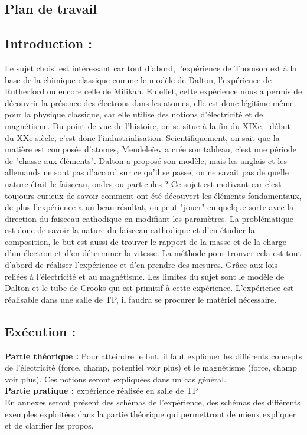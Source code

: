 \documentclass[../main.tex]{subfiles}
\begin{document}
\subsection{Plan de travail}


\subsection{Introduction :}
Le sujet choisi est intéressant car tout d'abord, l'expérience de Thomson est à la base de la chimique classique comme le modèle de Dalton, l'expérience de Rutherford ou encore celle de Milikan. En effet, cette expérience nous a permis de découvrir la présence des électrons dans les atomes, elle est donc légitime même pour la physique classique, car elle utilise des notions d'électricité et de magnétisme. Du point de vue de l'histoire, on se situe à la fin du XIXe - début du XXe siècle, c'est donc l'industrialisation. Scientifiquement, on sait que la matière est composée d'atomes, Mendeleïev a crée son tableau, c'est une période de "chasse aux éléments". Dalton a proposé son modèle, mais les anglais et les allemands ne sont pas d'accord sur ce qu'il se passe, on ne savait pas de quelle nature était le faisceau, ondes ou particules ? Ce sujet est motivant car c'est toujours curieux de savoir comment ont été découvert les éléments fondamentaux, de plus l'expérience a un beau résultat, on peut "jouer" en quelque sorte avec la direction du faisceau cathodique en modifiant les paramètres. La problématique est donc de savoir la nature du faisceau cathodique et d'en étudier la composition, le but est aussi de trouver le rapport de la masse et de la charge d'un électron et d'en déterminer la vitesse. La méthode pour trouver cela est tout d'abord de réaliser l'expérience et d'en prendre des mesures. Grâce aux lois reliées à l'électricité et au magnétisme. Les limites du sujet sont le modèle de Dalton et le tube de Crooks qui est primitif à cette expérience. L'expérience est réalisable dans une salle de TP, il faudra se procurer le matériel nécessaire.
\subsection{Exécution :}
\textbf{Partie théorique :} Pour atteindre le but, il faut expliquer les différents concepts de l'électricité (force, champ, potentiel voir plus) et le magnétisme (force, champ voir plus). Ces notions seront expliquées dans un cas général.\\
\textbf{Partie pratique :} expérience réalisée en salle de TP\\
En annexes seront présent des schémas de l'expérience, des schémas des différents exemples exploitées dans la partie théorique qui permettront de mieux expliquer et de clarifier les propos. 
\end{document}
